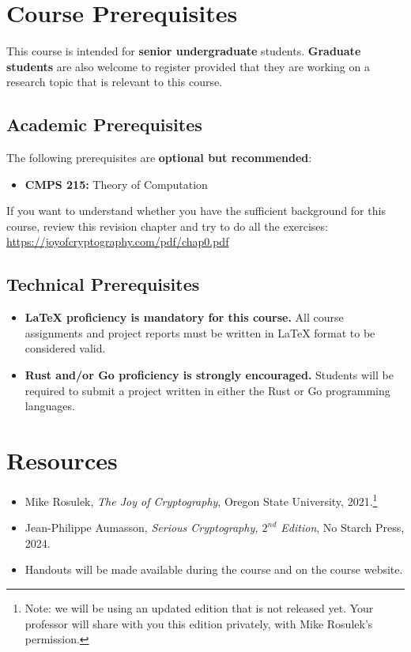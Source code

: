 \documentclass[10pt,a4paper,american]{exam}
\begin{document}
\section{Course Prerequisites}
This course is intended for \textbf{senior undergraduate} students. \textbf{Graduate students} are also welcome to register provided that they are working on a research topic that is relevant to this course.

\subsection{Academic Prerequisites}
The following prerequisites are \textbf{optional but recommended}:

\begin{itemize}
	\item \textbf{CMPS 215:} Theory of Computation
\end{itemize}

If you want to understand whether you have the sufficient background for this course, review this revision chapter and try to do all the exercises: \url{https://joyofcryptography.com/pdf/chap0.pdf}

\subsection{Technical Prerequisites}
\begin{itemize}
	\item \textbf{LaTeX proficiency is mandatory for this course.} All course assignments and project reports must be written in LaTeX format to be considered valid.
	\item \textbf{Rust and/or Go proficiency is strongly encouraged.} Students will be required to submit a project written in either the Rust or Go programming languages.
\end{itemize}

\section{Resources}
\begin{itemize}
	\item Mike Rosulek, \textit{The Joy of Cryptography}, Oregon State University, 2021.\footnote{Note: we will be using an updated edition that is not released yet. Your professor will share with you this edition privately, with Mike Rosulek's permission.}
	\item Jean-Philippe Aumasson, \textit{Serious Cryptography, $2^{nd}$ Edition}, No Starch Press, 2024.
	\item Handouts will be made available during the course and on the course website.
\end{itemize}
\end{document}
